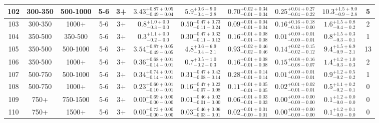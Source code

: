 \documentclass[11pt, oneside]{article}
\begin{document}
\begin{table}
{\begin{tabular}{ |c|c|c|c|c||c|c|c|c||c|c| }
102 & 300-350 & 500-1000 & 5-6 & 3+ & $3.43^{+0.87+0.05}_{-0.49-0.04}$ & $5.9^{+0.6+9.0}_{-0.4-2.8}$ & $0.70^{+0.02+0.34}_{-0.01-0.34}$ & $0.25^{+0.04+0.27}_{-0.04-0.22}$ & $10.3^{+1.5+9.0}_{-0.9-2.8}$ & 5 \\ \hline
103 & 300-350 & 1000+ & 5-6 & 3+ & $0.8^{+1.0+0.0}_{-0.3-0.0}$ & $0.50^{+0.47+0.73}_{-0.11-0.24}$ & $0.09^{+0.01+0.04}_{-0.01-0.04}$ & $0.16^{+0.16+0.18}_{-0.16-0.00}$ & $1.6^{+1.5+0.8}_{-0.4-0.2}$ & 2 \\ \hline
104 & 350-500 & 350-500 & 5-6 & 3+ & $0.3^{+1.1+0.0}_{-0.2-0.0}$ & $0.30^{+0.47+0.32}_{-0.11-0.12}$ & $0.16^{+0.01+0.08}_{-0.01-0.08}$ & $0.01^{+0.00+0.01}_{-0.00-0.01}$ & $0.8^{+1.5+0.3}_{-0.3-0.1}$ & 1 \\ \hline
105 & 350-500 & 500-1000 & 5-6 & 3+ & $3.54^{+0.87+0.05}_{-0.49-0.05}$ & $4.8^{+0.6+6.9}_{-0.4-2.1}$ & $0.93^{+0.02+0.46}_{-0.02-0.46}$ & $0.14^{+0.02+0.15}_{-0.02-0.12}$ & $9.4^{+1.5+6.9}_{-0.9-2.1}$ & 13 \\ \hline
106 & 350-500 & 1000+ & 5-6 & 3+ & $0.36^{+0.68+0.01}_{-0.14-0.01}$ & $0.7^{+0.5+1.0}_{-0.2-0.3}$ & $0.16^{+0.01+0.08}_{-0.01-0.08}$ & $0.15^{+0.08+0.16}_{-0.08-0.07}$ & $1.4^{+1.2+1.0}_{-0.3-0.3}$ & 2 \\ \hline
107 & 500-750 & 500-1000 & 5-6 & 3+ & $0.34^{+0.74+0.01}_{-0.14-0.01}$ & $0.31^{+0.47+0.42}_{-0.08-0.14}$ & $0.28^{+0.01+0.14}_{-0.01-0.14}$ & $0.01^{+0.00+0.01}_{-0.00-0.01}$ & $0.9^{+1.2+0.5}_{-0.2-0.2}$ & 1 \\ \hline
108 & 500-750 & 1000+ & 5-6 & 3+ & $0.23^{+0.60+0.01}_{-0.10-0.01}$ & $0.16^{+0.47+0.22}_{-0.07-0.08}$ & $0.11^{+0.01+0.05}_{-0.01-0.05}$ & $0.02^{+0.01+0.02}_{-0.01-0.01}$ & $0.5^{+1.1+0.2}_{-0.2-0.1}$ & 0 \\ \hline
109 & 750+ & 750-1500 & 5-6 & 3+ & $0.00^{+0.69+0.00}_{-0.00-0.00}$ & $0.01^{+0.46+0.02}_{-0.01-0.00}$ & $0.06^{+0.01+0.03}_{-0.01-0.03}$ & $0.00^{+0.00+0.00}_{-0.00-0.00}$ & $0.1^{+1.2+0.0}_{-0.0-0.0}$ & 0 \\ \hline
110 & 750+ & 1500+ & 5-6 & 3+ & $0.00^{+0.73+0.00}_{-0.00-0.00}$ & $0.03^{+0.46+0.06}_{-0.03-0.01}$ & $0.02^{+0.01+0.01}_{-0.00-0.01}$ & $0.00^{+0.00+0.00}_{-0.00-0.00}$ & $0.1^{+1.2+0.1}_{-0.0-0.0}$ & 0 \\ \hline
\end{tabular}}
\end{table}
\end{document}
